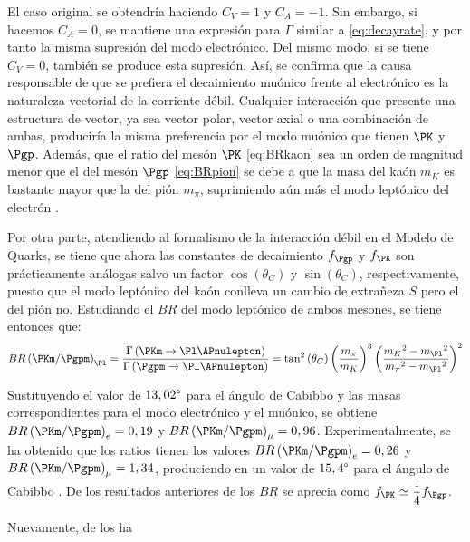 El caso original se obtendría haciendo $C_{V}=1$ y $C_{A}=-1$. Sin embargo, si hacemos $C_{A}=0$, se mantiene una expresión para $\Gamma$ similar a \ref{eq:decayrate}, y por tanto la misma supresión del modo electrónico. Del mismo modo, si se tiene $C_{V}=0$, también se produce esta supresión. Así, se confirma que la causa responsable de que se prefiera el decaimiento muónico frente al electrónico es la naturaleza vectorial de la corriente débil. Cualquier interacción que presente una estructura de vector, ya sea vector polar, vector axial o una combinación de ambas, produciría la misma preferencia por el modo muónico que tienen $\PK$ y $\Pgp$. Además, que el ratio del mesón $\PK$ \ref{eq:BRkaon} sea un orden de magnitud menor que el del mesón $\Pgp$ \ref{eq:BRpion} se debe a que la masa del kaón $m_{K}$ es bastante mayor que la del pión $m_{\pi}$, suprimiendo aún más el modo leptónico del electrón \cite{Renton}.

Por otra parte, atendiendo al formalismo de la interacción débil en el Modelo de Quarks, se tiene que ahora las constantes de decaimiento $f_{\Pgp}$ y $f_{\PK}$ son prácticamente análogas salvo un factor $\cos \left( \theta _{C}\right)$ y $\sin \left( \theta _{C}\right)$, respectivamente, puesto que el modo leptónico del kaón conlleva un cambio de extrañeza $S$ pero el del pión no. Estudiando el $BR$ del modo leptónico de ambos mesones, se tiene entonces que:
\begin{equation}
BR\left(\PKm / \Pgpm\right)_{\Pl}=\dfrac{\Gamma \left( \PKm \rightarrow \Pl \APnulepton\right) }{\Gamma \left( \Pgpm \rightarrow \Pl \APnulepton\right)}=\tan ^{2}\left( \theta _{C}\right) \left( \dfrac{m_{\pi}}{m_{K}}\right) ^{3}\left( \dfrac{{m_{K}}^{2}-{m_{\Pl}}^{2}}{{m_{\pi}}^{2}-{m_{\Pl}}^{2}}\right) ^{2}
\end{equation}

Sustituyendo el valor de $13,02\degree$ para el ángulo de Cabibbo y las masas correspondientes para el modo electrónico y el muónico, se obtiene $BR\left(\PKm / \Pgpm\right)_{e}=0,19$ y $BR\left(\PKm / \Pgpm\right)_{\mu}=0,96$. Experimentalmente, se ha obtenido que los ratios tienen los valores $BR\left(\PKm / \Pgpm\right)_{e}=0,26$ y $BR\left(\PKm / \Pgpm\right)_{\mu}=1,34$, produciendo en un valor de  $15,4\degree$ para el ángulo de Cabibbo \cite{Griffiths2008}. De los resultados anteriores de los $BR$ se aprecia como $f_{\PK} \simeq \dfrac{1}{4} f_{\Pgp}$. 

Nuevamente, de los ha



